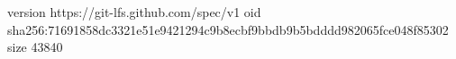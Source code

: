 version https://git-lfs.github.com/spec/v1
oid sha256:71691858dc3321e51e9421294c9b8ecbf9bbdb9b5bdddd982065fce048f85302
size 43840
